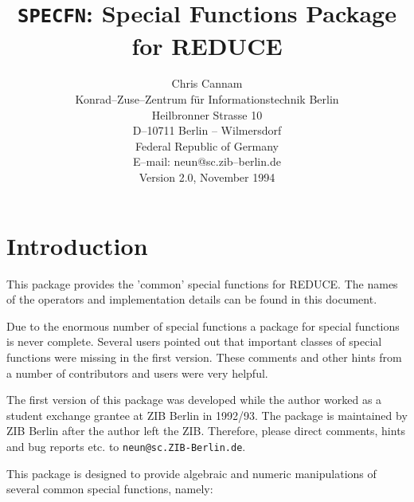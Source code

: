 \title{{\tt SPECFN}: Special Functions Package for REDUCE}
\date{}
\author{Chris Cannam\\[0.05in]
Konrad--Zuse--Zentrum f\"ur Informationstechnik Berlin \\
Heilbronner Strasse 10 \\
D--10711 Berlin -- Wilmersdorf \\
Federal Republic of Germany \\[0.05in]
E--mail: neun@sc.zib--berlin.de \\[0.05in]
Version 2.0, November 1994}

\maketitle
{}
\section{Introduction}

This package provides the 'common' special functions for REDUCE.
The names of the operators and implementation details can be
found in this document.

Due to the enormous number of special functions
a package for special functions is never complete.
Several users pointed out that important classes
of special functions were missing in the first version.
These comments and other hints from a number of contributors
and users were very helpful.

The first version of this package was developed while the author
worked as a student exchange grantee at ZIB Berlin in 1992/93.
The package is maintained by ZIB Berlin after the author left the ZIB.
Therefore, please direct comments, hints and bug reports etc. to
{\tt neun@sc.ZIB-Berlin.de}.

This package is designed to provide algebraic and numeric manipulations of
several common special functions, namely:

